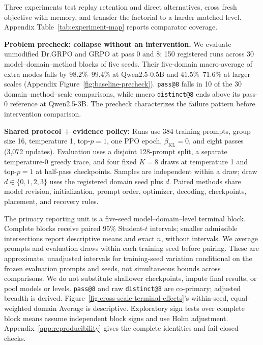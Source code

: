 \documentclass{article}
\newcommand{\1}{\mathbf 1}
\theoremstyle{remark}
\theoremstyle{definition}
\theoremstyle{plain}
\begin{document}
Three experiments test replay retention and direct alternatives, cross
fresh objective with memory, and transfer the factorial to a harder matched
level. Appendix Table~\ref{tab:experiment-map} reports comparator coverage.

\noindent\textbf{Problem precheck: collapse without an intervention.}
We evaluate unmodified Dr.GRPO and GRPO at pass 0 and 8: 150
registered runs across 30 model--domain--method blocks of five seeds. Their
five-domain macro-average of extra modes falls by \(98.2\%\)--\(99.4\%\)
at Qwen2.5-0.5B and \(41.5\%\)--\(71.6\%\) at larger scales
(Appendix Figure~\ref{fig:baseline-precheck}). \texttt{pass@8} falls in 10 of
the 30 domain--method--scale comparisons, while macro \texttt{distinct@8} ends
above its pass-0 reference at Qwen2.5-3B. The
precheck characterizes the failure pattern before intervention comparison.


\label{sec:shared-protocol}
\noindent\textbf{Shared protocol + evidence policy:} Runs use 384 training
prompts, group size 16, temperature 1, top-\(p=1\), one PPO epoch,
\(\beta_{\mathrm{KL}}=0\), and eight passes (3,072 updates). Evaluation uses a
disjoint 128-prompt split, a separate temperature-0 greedy trace, and four
fixed \(K=8\) draws at temperature 1 and top-\(p=1\) at half-pass checkpoints.
Samples are independent within a draw; draw \(d\in\{0,1,2,3\}\) uses the
registered domain seed plus \(d\). Paired methods share model revision,
initialization, prompt order, optimizer, decoding, checkpoints, placement, and
recovery rules.

The primary reporting unit is a five-seed model--domain--level terminal block.
Complete blocks receive paired 95\% Student-\(t\) intervals; smaller admissible
intersections report descriptive means and exact \(n\), without intervals.
We average prompts and evaluation draws within each training seed before
pairing. These are approximate, unadjusted intervals for training-seed
variation conditional on the frozen evaluation prompts and seeds, not
simultaneous bounds across comparisons. We do not substitute
shallower checkpoints, impute final results, or pool models or levels.
\texttt{pass@8} and raw \texttt{distinct@8} are co-primary; adjusted breadth is
derived. Figure~\ref{fig:cross-scale-terminal-effects}'s within-seed, equal-weighted
domain Average is descriptive. Exploratory sign tests over complete block
means assume independent block signs and use Holm adjustment.
Appendix~\ref{app:reproducibility} gives the complete identities and fail-closed
checks.
\end{document}
